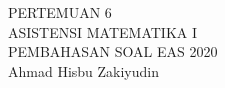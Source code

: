 \documentclass{article}
\begin{document}
 \begin{titlepage}
    \vspace*{\fill}
    \begin{center}
      \Huge {PERTEMUAN 6 \\ ASISTENSI MATEMATIKA I\\PEMBAHASAN SOAL EAS 2020}\\[0.4 cm]
      \huge {Ahmad Hisbu Zakiyudin}
    \end{center}
    \vspace*{\fill}
  \end{titlepage}
\makeatletter
\renewcommand*\env@matrix[1][*\c@MaxMatrixCols c]{%
  \hskip -\arraycolsep
  \let\@ifnextchar\new@ifnextchar
  \array{#1}}
\makeatother
\newcount\arrowcount
\newcommand\arrows[1]{
        \global\arrowcount#1
        \ifnum\arrowcount>0
                \begin{matrix}[c]
                \expandafter\nextarrow
        \fi
}

\newcommand\nextarrow[1]{
        \global\advance\arrowcount-1
        \ifx\relax#1\relax\else \xrightarrow{#1}\fi
        \ifnum\arrowcount=0
                \end{matrix}
        \else
                \\
                \expandafter\nextarrow
        \fi
}
\newpage
{}
\end{document}

